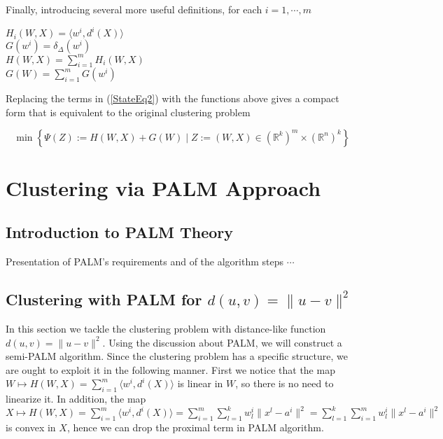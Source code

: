 \documentclass[11pt]{article}
\numberwithin{equation}{section}
\begin{document}
Finally, introducing several more useful definitions, for each $i=1, \cdots , m$

\begin{center}
$H_i(W,X) = \langle w^i , d^i(X) \rangle$
\\ \smallskip
$G(w^i) = \delta_{\Delta}(w^i)$
\\ \smallskip
$H(W,X) = \sum\limits_{i=1}^{m} H_i(W,X)$
\\ \smallskip
 $G(W) = \sum\limits_{i=1}^{m} G(w^i)$
\\
\end{center}

Replacing the terms in (\ref{StateEq2}) with the functions above gives a compact form that is equivalent to the original clustering problem

\begin{equation}
	\min \left\lbrace \Psi(Z) := H(W,X) + G(W) \mid Z := (W,X) \in (\mathbb{R}^k)^m \times (\mathbb{R}^n)^k \right\rbrace \label{StateEq4}
\end{equation}


\section{Clustering via PALM Approach}

\subsection{Introduction to PALM Theory}

Presentation of PALM's requirements and of the algorithm steps  $\cdots$

\subsection{Clustering with PALM for $d(u,v) = \|u-v\|^2$}

In this section we tackle the clustering problem with distance-like function $d(u,v) = \|u-v\|^2$. Using the discussion about PALM, we will construct a semi-PALM algorithm.
Since the clustering problem has a specific structure, we are ought to exploit it in the following manner.
First we notice that the map 
$W \mapsto H(W,X)=\sum\limits_{i=1}^{m} \langle w^i , d^i(X) \rangle$ is linear in $W$, so there is no need to linearize it. In addition, the map 
$X \mapsto H(W,X) = \sum\limits_{i=1}^{m} \langle w^i , d^i(X) \rangle = 
\sum\limits_{i=1}^{m} \sum\limits_{l=1}^{k} w^i_l \|x^l - a^i\|^2 =
\sum\limits_{l=1}^{k} \sum\limits_{i=1}^{m} w^i_l \|x^l - a^i\|^2$ is convex in $X$, hence we can drop the proximal term in PALM algorithm.
\end{document}
